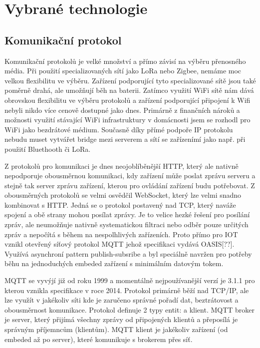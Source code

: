 \section{Vybrané technologie}

\subsection{Komunikační protokol}   %
Komunikační protokolů je velké množství a přímo závisí na výběru přenosného média. Při použití specializovaných sítí jako LoRa nebo Zigbee, nemáme moc velkou flexibilitu ve výběru. Zařízení podporující tyto specializované sítě jsou také poměrně drahá, ale umožňují běh na baterii. Zatímco využití WiFi sítě nám dává obrovskou flexibilitu ve výběru protokolů a zařízení podporující připojení k Wifi nebyli nikdo více cenově dostupné jako dnes. Primárně z finančních nároků a možnosti využití stávající WiFi infrastruktury v domácnosti jsem se rozhodl pro WiFi jako bezdrátové médium. Současně díky přímé podpoře IP protokolu nebudu muset vytvářet bridge mezi serverem a sítí se zařízenímí jako např. při použití Bluethooth či LoRa.

Z protokolů pro komunikaci je dnes neojoblíběnější HTTP, který ale nativně nepodporuje obousměrnou komunikaci, kdy zařízení může poslat zprávu serveru a stejně tak server zprávu zařízení, kterou pro ovládání zařízení budu potřebovat. Z obousměrných protokolů se velmi osvědčil WebSocket, který lze velmi snadno kombinovat s HTTP. Jedná se o protokol postavený nad TCP, který naváže spojení a obě strany mohou posílat zprávy. Je to velice hezké řešení pro posílání zpráv, ale neumožňuje nativně systematickou filtraci nebo odběr pouze určitých zpráv a nepočítá s během na nespolhlivých zařízeních. Proto přímo pro IOT vznikl otevřený síťový protokol MQTT jehož specifikaci vydává OASIS[??]. Využívá asynchroní pattern publish-subsribe a byl speciálně navržen pro potřeby běhu na jednoduchých embeded zařízení s minimálním datovým tokem.

MQTT se vyvýjí již od roku 1999 a momentálně nejpoužívanější verzí je 3.1.1 pro kterou vznikla specifikace v roce 2014. Protokol primárně běží nad TCP/IP, ale lze využít v jakékoliv síti kde je zaručeno správné pořadí dat, beztrátovost a obousměrnost komunikace. Protokol definuje 2 typy entit:  a klient. MQTT broker je server, který přijímá všechny zprávy od připojených klientů a přeposílá je správným příjemncům (klientům). MQTT klient je jakékoliv zařízení (od embeded až po server), které komunikuje s brokerem přes síť.

